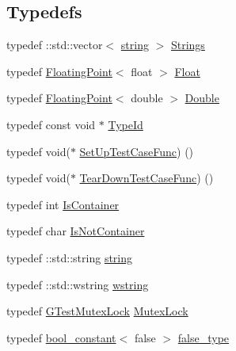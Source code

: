 \subsection*{Typedefs}
\begin{DoxyCompactItemize}
\item 
typedef \+::std\+::vector$<$ \mbox{\hyperlink{namespacetesting_1_1internal_a8e8ff5b11e64078831112677156cb111}{string}} $>$ \mbox{\hyperlink{namespacetesting_1_1internal_a7706b17f05f4b49e351b052ae4e05073}{Strings}}
\item 
typedef \mbox{\hyperlink{classtesting_1_1internal_1_1_floating_point}{Floating\+Point}}$<$ float $>$ \mbox{\hyperlink{namespacetesting_1_1internal_a02e1981f5ff70609e6ac06e006ff519a}{Float}}
\item 
typedef \mbox{\hyperlink{classtesting_1_1internal_1_1_floating_point}{Floating\+Point}}$<$ double $>$ \mbox{\hyperlink{namespacetesting_1_1internal_a66a7579b1893b260c31dad577f7a5c48}{Double}}
\item 
typedef const void $\ast$ \mbox{\hyperlink{namespacetesting_1_1internal_ab1114197d3c657d8b7f8e0c5caa12d00}{Type\+Id}}
\item 
typedef void($\ast$ \mbox{\hyperlink{namespacetesting_1_1internal_a30037044c0b57cdd647c7e2e97cb2cff}{Set\+Up\+Test\+Case\+Func}}) ()
\item 
typedef void($\ast$ \mbox{\hyperlink{namespacetesting_1_1internal_a085e31321d0d029c04d2a79234f60c1a}{Tear\+Down\+Test\+Case\+Func}}) ()
\item 
typedef int \mbox{\hyperlink{namespacetesting_1_1internal_ad8f0c2883245f1df2a53618a49f0deb3}{Is\+Container}}
\item 
typedef char \mbox{\hyperlink{namespacetesting_1_1internal_abf080521ce135deb510e0a7830fd3d33}{Is\+Not\+Container}}
\item 
typedef \+::std\+::string \mbox{\hyperlink{namespacetesting_1_1internal_a8e8ff5b11e64078831112677156cb111}{string}}
\item 
typedef \+::std\+::wstring \mbox{\hyperlink{namespacetesting_1_1internal_a3f543179329c353aee1d7b54a9a8e335}{wstring}}
\item 
typedef \mbox{\hyperlink{classtesting_1_1internal_1_1_g_test_mutex_lock}{G\+Test\+Mutex\+Lock}} \mbox{\hyperlink{namespacetesting_1_1internal_a08b187c6cc4e28400aadf9a32fccc8de}{Mutex\+Lock}}
\item 
typedef \mbox{\hyperlink{structtesting_1_1internal_1_1bool__constant}{bool\+\_\+constant}}$<$ false $>$ \mbox{\hyperlink{namespacetesting_1_1internal_abb1d0789f19bdde21affccbd1078b525}{false\+\_\+type}}

\end{DoxyCompactItemize}
